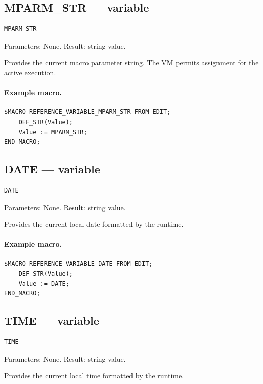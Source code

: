 \documentclass[a4paper,10pt,twoside,openany]{book}
\begin{document}
\label{prim:variable-mparm-str}
\subsection*{MPARM\_STR --- variable}
\begin{verbatim}
MPARM_STR
\end{verbatim}
Parameters: None. Result: string value.

Provides the current macro parameter string. The VM permits assignment for the active execution.

\paragraph{Example macro.}
\begin{verbatim}
$MACRO REFERENCE_VARIABLE_MPARM_STR FROM EDIT;
    DEF_STR(Value);
    Value := MPARM_STR;
END_MACRO;
\end{verbatim}

\label{prim:variable-date}
\subsection*{DATE --- variable}
\begin{verbatim}
DATE
\end{verbatim}
Parameters: None. Result: string value.

Provides the current local date formatted by the runtime.

\paragraph{Example macro.}
\begin{verbatim}
$MACRO REFERENCE_VARIABLE_DATE FROM EDIT;
    DEF_STR(Value);
    Value := DATE;
END_MACRO;
\end{verbatim}

\label{prim:variable-time}
\subsection*{TIME --- variable}
\begin{verbatim}
TIME
\end{verbatim}
Parameters: None. Result: string value.

Provides the current local time formatted by the runtime.
\end{document}
